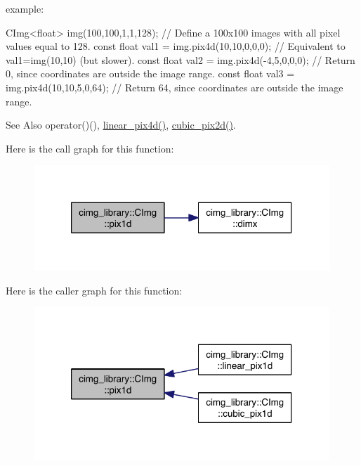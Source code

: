\begin{DoxyParagraph}{example\-:}

\begin{DoxyCode}
CImg<float> img(100,100,1,1,128);           \textcolor{comment}{// Define a 100x100 images with all pixel values equal to 128.}
\textcolor{keyword}{const} \textcolor{keywordtype}{float} val1 = img.pix4d(10,10,0,0,0);  \textcolor{comment}{// Equivalent to val1=img(10,10) (but slower).}
\textcolor{keyword}{const} \textcolor{keywordtype}{float} val2 = img.pix4d(-4,5,0,0,0);   \textcolor{comment}{// Return 0, since coordinates are outside the image range.}
\textcolor{keyword}{const} \textcolor{keywordtype}{float} val3 = img.pix4d(10,10,5,0,64); \textcolor{comment}{// Return 64, since coordinates are outside the image range.}
\end{DoxyCode}

\end{DoxyParagraph}
\begin{DoxySeeAlso}{See Also}
operator()(), \hyperlink{structcimg__library_1_1_c_img_ad201bbecc0caabbe566ea7507cd657cf}{linear\-\_\-pix4d()}, \hyperlink{structcimg__library_1_1_c_img_ab26403a66e670b53ef8f706fe83247a7}{cubic\-\_\-pix2d()}. 
\end{DoxySeeAlso}


Here is the call graph for this function\-:
\nopagebreak
\begin{figure}[H]
\begin{center}
\leavevmode
\includegraphics[width=316pt]{structcimg__library_1_1_c_img_ab5ef0ea3ac3076504ff33c098abd27ab_cgraph}
\end{center}
\end{figure}




Here is the caller graph for this function\-:
\nopagebreak
\begin{figure}[H]
\begin{center}
\leavevmode
\includegraphics[width=316pt]{structcimg__library_1_1_c_img_ab5ef0ea3ac3076504ff33c098abd27ab_icgraph}
\end{center}
\end{figure}


